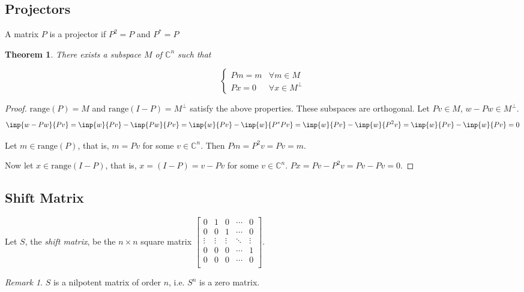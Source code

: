 \documentclass[twofold]{article}
\newcommand*\adj[1]{#1^*}
\newcommand*\norm[1]{\left \Vert #1 \right\Vert}
\theoremstyle{plain}
\newtheorem{theorem}{Theorem}
\theoremstyle{definition}
\theoremstyle{remark}
\newtheorem*{remark}{Remark}
\begin{document}
\subsection{Projectors}
A matrix \(P\) is a projector if \(P^2 = P\) and \(\adj{P} = P\)

\begin{theorem} There exists a subspace \(M\) of \(\mathbb{C}^n\) such that 

\[\begin{cases}
Pm = m & \forall m \in M \\
Px = 0 & \forall x \in M^\perp 
\end{cases}\] 
\end{theorem}
\begin{proof}  \(\mathrm{range}(P)= M\) and \(\mathrm{range}(I - P) = M^\perp\) satisfy the above properties. These subspaces are orthogonal. Let \(Pv \in M\), \(w - Pw \in M^\perp\). 
\[\inp{w - Pw}{Pv} = \inp{w}{Pv} - \inp{Pw}{Pv} = \inp{w}{Pv} - \inp{w}{\adj{P}Pv} = \inp{w}{Pv} - \inp{w}{P^2v} = \inp{w}{Pv} - \inp{w}{Pv} = 0\]

Let \(m \in \mathrm{range}(P)\), that is, \(m= Pv\) for some \(v \in \mathbb{C}^n\). Then \(Pm = P^2 v = Pv = m\). 

Now let \(x \in \mathrm{range}(I - P)\), that is, \(x = (I - P) = v - Pv\) for some \(v \in \mathbb{C}^n\). \(Px = Pv - P^2v = Pv - Pv = 0\).
 \end{proof}

\subsection{Shift Matrix}
Let \(S\), the {\em shift matrix},  be the \(n \times n\) square matrix \( \begin{bmatrix} 
0 & 1 & 0 & \cdots & 0 \\
0 & 0 & 1 & \cdots & 0 \\
\vdots & \vdots & \vdots &\ddots & \vdots \\
0 & 0 & 0 &\cdots & 1 \\
0 & 0 & 0 & \cdots & 0 \\ 
\end{bmatrix}\). 

 \begin{remark} \(S\) is a nilpotent matrix of order \(n\), i.e. \(S^n\) is a zero matrix. \end{remark}

\end{document}
